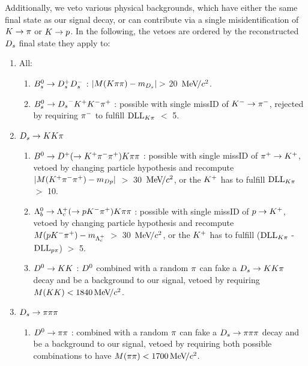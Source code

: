 Additionally, we veto various physical backgrounds, which have either the same final state as our signal decay, or can contribute via a single misidentification of $\kaon\to\pion$ or $\kaon\to\proton$. 
In the following, the vetoes are ordered by the reconstructed $\Ds$ final state they apply to: 


\begin{enumerate}

\item All:

\begin{enumerate}

\item $\Bs\to\Dsp\Dsm$ : $|M(\kaon\pion\pion) - m_{\Ds}| >$ 20 $\mevcc$.

\item $\Bs\to\Ds^{-}\Kp\Km\pip$ : possible with single missID of $\Km\rightarrow\pim$, rejected by requiring $\pim$ to fulfill $\dllkpi$ $<$ 5. 

\end{enumerate}

\item $\Ds\to\kaon\kaon\pion$

\begin{enumerate}

\item $\Bz\to\Dp(\to\Kp\pim\pip)\kaon\pion\pion$ : possible with single missID of $\pip\rightarrow\Kp$, vetoed by changing particle hypothesis and recompute $|M(\Kp\pim\pip) - m_{Dp}|$ $>$ 30 $\mevcc$, 
or the $\Kp$ has to fulfill $\dllkpi$ $>$ 10.

\item $\Lb\to\Lc(\to\proton\Km\pip)\kaon\pion\pion$ : possible with single missID of $\proton\rightarrow\Kp$, vetoed by changing particle hypothesis and recompute $M(\proton\Km\pip) - m_{\Lc}$ $>$ 30 $\mevcc$, 
or the $\Kp$ has to fulfill ($\dllkpi$ - $\dllppi$) $>$ 5.

\item $\Dz\to\kaon\kaon$ : $\Dz$ combined with a random $\pion$ can fake a $\Ds\to\kaon\kaon\pion$ decay and be a background to our signal, vetoed by requiring $M(\kaon\kaon) < 1840 \mevcc$. 

\end{enumerate}


\item $\Ds\to\pion\pion\pion$

\begin{enumerate}

\item $\Dz\to\pion\pion$ : combined with a random $\pion$ can fake a $\Ds\to\pion\pion\pion$ decay and be a background to our signal, vetoed by requiring both possible combinations to have $M(\pion\pion) < 1700 \mevcc$.

\end{enumerate}

\end{enumerate}


